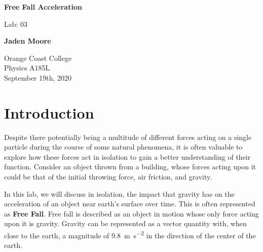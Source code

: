 \documentclass[12pt]{article}
\begin{document}

\begin{titlepage}
    \begin{center}
        \vspace*{1cm}
        \textbf{Free Fall Acceleration}

        \vspace{0.5cm}
        Lab: 03

        \vspace{1cm}

        \textbf{Jaden Moore}

        \vfill

        Orange Coast College\\
        Physics A185L\\
        September 19th, 2020

    \end{center}
\end{titlepage}

\pagestyle{fancy}
\fancyhf{}
\setlength{\headheight}{15pt}
\cfoot{\thepage}

\begin{filecontents}{data1.csv}
    T      Y
    0.00   5.58
    0.10   5.54
    0.20   5.38
    0.30   5.12
    0.40   4.76
    0.50   4.34
    0.60   3.80
    0.70   3.14
    0.80   2.40
    0.90   1.58
    1.00   0.66
    };
\end{filecontents}

\begin{filecontents}{data2.csv}
    T      Y
    0.00   5.58
    0.01   5.54
    0.04   5.38
    0.09   5.12
    0.16   4.76
    0.25   4.34
    0.36   3.80
    0.49   3.14
    0.64   2.40
    0.81   1.58
    1.00   0.66
    };
\end{filecontents}

\section{Introduction}
Despite there potentially being a multitude of different forces acting on a single particle during the course of some natural phenomena, it is often valuable to explore how these forces act in isolation to gain a better understanding of their function. Consider an object thrown from a building, whose forces acting upon it could be that of the initial throwing force, air friction, and gravity.

In this lab, we will discuss in isolation, the impact that gravity has on the acceleration of an object near earth's surface over time. This is often represented as \textbf{Free Fall}. Free fall is described as an object in motion whose only force acting upon it is gravity. Gravity can be represented as a vector quantity with, when close to the earth, a magnitude of \SI{9.8}{\metre\per\second\squared} in the direction of the center of the earth.
\end{document}
